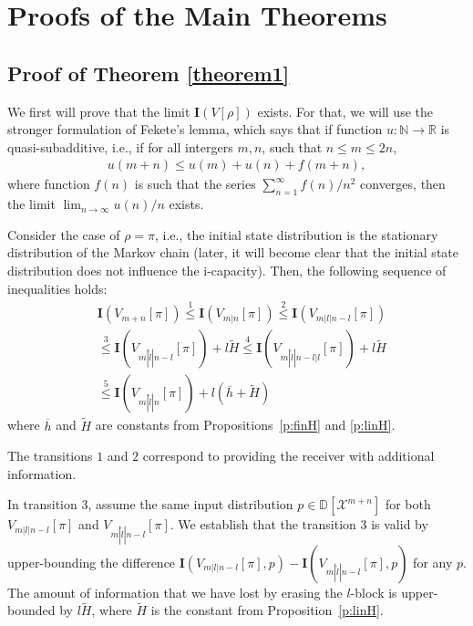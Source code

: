 \documentclass[journal, twocol]{IEEEtran}
\newcommand{\oh}{{\overline{h}}}
\newcommand{\tl}{{\widetilde{l}}}
\newcommand{\bD}{{\mathbb{D}}}
\newcommand{\tH}{{\widetilde{H}}}
\newcommand{\bfI}{{\mathbf{I}}}
\newcommand{\bN}{{\mathbb{N}}}
\newcommand{\bR}{{\mathbb{R}}}
\newcommand{\mX}{{\mathcal{X}}}
\begin{document}
\section{Proofs of the Main Theorems}
\label{s:proofs}

\subsection{Proof of Theorem \ref{theorem1}}
We first will prove that the limit 
$\bfI(V[\rho])$ exists.
For that, we will use the stronger formulation \cite{bruijn52linear} of Fekete's lemma, which says that if function $u:\bN\to\bR$ is quasi-subadditive, i.e., if for all intergers $m,n$, such that $n \leq m \leq 2n$,
\begin{align}
u(m+n)\leq u(m)+u(n)+f(m+n),
\label{eq:gfl}
\end{align}
where function $f(n)$ is such that the series $\sum_{n=1}^\infty f(n)/n^2$ converges, then the limit $\lim_{n\to\infty}u(n)/n$ exists.

Consider the case of $\rho=\pi$, i.e., the initial state distribution is the stationary distribution of the Markov chain (later, it will become clear that the initial state distribution does not influence the i-capacity).
Then, the following sequence of inequalities holds:
\begin{align}
&\bfI(V_{m+n}[\pi]) \stackrel{1}{\leq}
\bfI(V_{m|n}[\pi]) \stackrel{2}{\leq}
\bfI(V_{m|l|n-l}[\pi]) 
\nonumber\\&
\stackrel{3}{\leq}
\bfI(V_{m|\tl|n-l}[\pi])+l\tH
\stackrel{4}{\leq} 
\bfI(V_{m|\tl|n-l|l}[\pi])+l\tH
\nonumber\\ &
\stackrel{5}{\leq} 
\bfI(V_{m|\tl|n}[\pi])+l(\oh+\tH)
\label{eq:VmnVmln}
\end{align}
where $\oh$ and $\tH$ are constants from Propositions~\ref{p:finH} and \ref{p:linH}.

The transitions $1$ and $2$ correspond to providing the receiver with additional information.

In transition $3$, assume the same input distribution $p\in\bD[\mX^{m+n}]$ for both $V_{m|l|n-l}[\pi]$ and $V_{m|\tl|n-l}[\pi]$.
We establish that the transition $3$ is valid by upper-bounding the difference $\bfI(V_{m|l|n-l}[\pi], p)-\bfI(V_{m|\tl|n-l}[\pi], p)$ for any $p$.
The amount of information that we have lost by erasing the $l$-block is upper-bounded by $l\tH$, where $\tH$ is the constant from Proposition~\ref{p:linH}.
\end{document}
